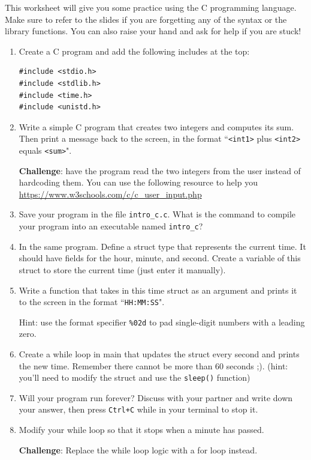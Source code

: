 \documentclass{./worksheet}
\begin{document}
This worksheet will give you some practice using the C programming language. Make sure to refer to the slides if you are forgetting
any of the syntax or the library functions. You can also raise your hand and ask for help if you are stuck!
\begin{enumerate}

\item Create a C program and add the following includes at the top:
\begin{verbatim}
#include <stdio.h>
#include <stdlib.h>
#include <time.h>
#include <unistd.h>
\end{verbatim}


\item Write a simple C program that creates two integers and computes its sum.
Then print a message back to the screen, in the format ``\verb|<int1>| plus \verb|<int2>| equals \verb|<sum>|".

\textbf{Challenge}: have the program read the two integers from the user instead of hardcoding them.
You can use the following resource to help you \url{https://www.w3schools.com/c/c_user_input.php}

\item Save your program in the file \verb|intro_c.c|. What is the command to compile your
program into an executable named \verb|intro_c|?
\vspace{0.5in}

\item In the same program. Define a struct type that represents the current
time. It should have fields for the hour, minute, and second. Create a variable
of this struct to store the current time (just enter it manually).

\item Write a function that takes in this time struct as an argument and
prints it to the screen in the format ``\verb|HH:MM:SS|".

Hint: use the format specifier \verb|%02d| to pad single-digit numbers with a leading zero.

\item Create a while loop in main that updates the struct every second and prints the new time.
Remember there cannot be more than 60 seconds ;).
(hint: you'll need to modify the struct and use the \verb|sleep()| function)

\item Will your program run forever? Discuss with your partner and write down
your answer, then press \verb|Ctrl+C| while in your terminal to stop it.
\vspace{1in}

\item Modify your while loop so that it stops when a minute has passed.

\textbf{Challenge}: Replace the while loop logic with a for loop instead.

\end{enumerate}
\end{document}
